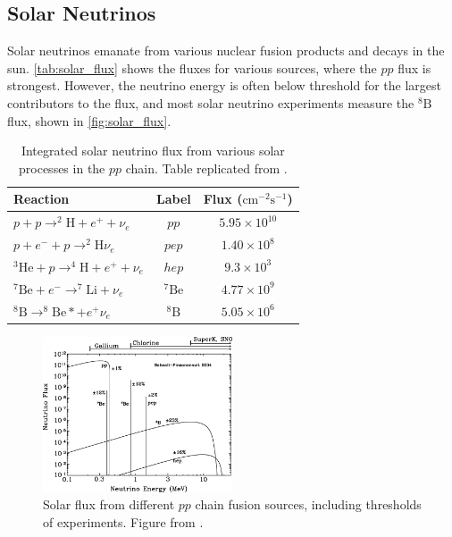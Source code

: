 \subsection{Solar Neutrinos}
Solar neutrinos emanate from various nuclear fusion products and decays in the sun. \autoref{tab:solar_flux} shows the fluxes for various sources, where the $pp$ flux is strongest. However, the neutrino energy is often below threshold for the largest contributors to the flux, and most solar neutrino experiments measure the $^{8}\text{B}$ flux, shown in \autoref{fig:solar_flux}.
\begin{table}[h]
	\begin{tabular}{l | c c}
		\hline
		\hline
		Reaction & Label & Flux ($\text{cm}^{-2} \text{s}^{-1}$) \\
		\hline
		$p+p\rightarrow ^{2}\text{H} + e^+ + \nu_e$ & $pp$ & $5.95\times10^{10}$ \\
		$p+e^-+p\rightarrow ^{2}\text{H} \nu_e$ & $pep$ & $1.40\times10^{8}$ \\
		$^{3}\text{He} + p\rightarrow ^{4}\text{H} + e^+ + \nu_e$ & $hep$ & $9.3\times10^{3}$ \\
		$^{7}\text{Be} + e^- \rightarrow ^{7}\text{Li} + \nu_e$ & $^{7}\text{Be}$ & $4.77\times10^{9}$ \\
		$^{8}\text{B} \rightarrow ^{8}\text{Be}* + e^+ \nu_e$ & $^{8}\text{B}$ & $5.05\times10^{6}$ \\
		\hline
		\hline
	\end{tabular}
	\caption{Integrated solar neutrino flux from various solar processes in the $pp$ chain. Table replicated from \cite{solar_review}.}
	\label{tab:solar_flux}
\end{table}

\begin{figure}[h]
	\includegraphics[width=0.5\textwidth, trim={0mm 0mm 0mm 0mm}, clip,page=1]{figures/theory/solar_flux}
	\caption{Solar flux from different $pp$ chain fusion sources, including thresholds of experiments. Figure from \cite{sno_solar_flux}.}
	\label{fig:solar_flux}
\end{figure}

